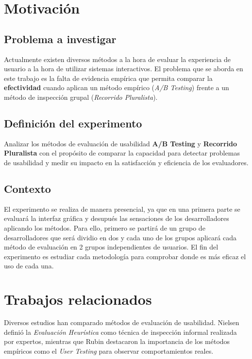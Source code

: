 \documentclass[a4paper,12pt]{report}
\begin{document}
\chapter{Motivación}

\section{Problema a investigar}
Actualmente existen diversos métodos a la hora de evaluar la experiencia de usuario a la hora de utilizar sistemas interactivos. El problema que se aborda en este trabajo es la falta de evidencia empírica que permita comparar la \textbf{efectividad} cuando aplican un método empírico (\textit{A/B Testing}) frente a un método de inspección grupal (\textit{Recorrido Pluralista}).

\section{Definición del experimento}
Analizar los métodos de evaluación de usabilidad \textbf{A/B Testing} y \textbf{Recorrido Pluralista} con el propósito de comparar la capacidad para detectar problemas de usabilidad y medir su impacto en la satisfacción y eficiencia de los evaluadores.


\section{Contexto}
El experimento se realiza de manera presencial, ya que en una primera parte se evaluará la interfaz gráfica y desupués las sensaciones de los desarrolladores aplicando los métodos. Para ello, primero se partirá de un grupo de desarrolladores que será dividio en dos y cada uno de los grupos aplicará cada método de evaluación en 2 grupos independientes de usuarios. El fin del experimento es estudiar cada metodología para comprobar donde es más eficaz el uso de cada una.

\chapter{Trabajos relacionados}

Diversos estudios han comparado métodos de evaluación de usabilidad. Nielsen \cite{nielsen1994usability} definió la \textit{Evaluación Heurística} como técnica de inspección informal realizada por expertos, mientras que Rubin \cite{rubin2011handbook} destacaron la importancia de los métodos empíricos como el \textit{User Testing} para observar comportamientos reales.  
\end{document}
